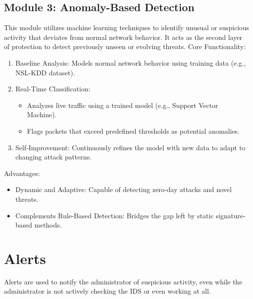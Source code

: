 \documentclass[oneside, english]{reports/assets/sdqtechreport}
\begin{document}
\section{Module 3: Anomaly-Based Detection}
\label{sec:AnomalyBasedDetection}
This module utilizes machine learning techniques to identify unusual or suspicious activity that deviates from normal network behavior. It acts as the second layer of protection to detect previously unseen or evolving threats.
Core Functionality:
\begin{enumerate}
	\item Baseline Analysis: Models normal network behavior using training data (e.g., NSL-KDD dataset).
	\item Real-Time Classification:
	\begin{itemize}
   		\item Analyzes live traffic using a trained model (e.g., Support Vector Machine).
   		\item Flags packets that exceed predefined thresholds as potential anomalies.
	\end{itemize}
	\item Self-Improvement: Continuously refines the model with new data to adapt to changing attack patterns.
\end{enumerate}
Advantages:
\begin{itemize}
	\item Dynamic and Adaptive: Capable of detecting zero-day attacks and novel threats.
	\item Complements Rule-Based Detection: Bridges the gap left by static signature-based methods.
\end{itemize}

\chapter{Alerts}
\label{chap:Alerts}
Alerts are used to notify the administrator of suspicious activity, even while
the administrator is not actively checking the IDS or even working at all.
\end{document}

